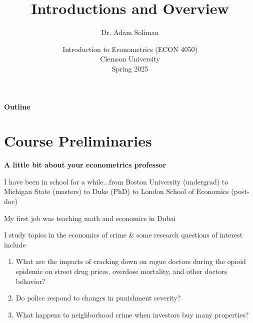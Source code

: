 \documentclass[11pt, aspectratio=169]{beamer}
\newenvironment{wideitemize}{\itemize\addtolength{\itemsep}{5pt}}{\enditemize}
\begin{document}
	 

\title{Introductions and Overview}
\author{Dr. Adam Soliman}
\date{Introduction to Econometrics (ECON 4050) \\ Clemson University\\Spring 2025} 

\begin{frame}
	\maketitle
\end{frame}	
 
\begin{frame}{\bf \large Outline}
	\tableofcontents
\end{frame} 

\section{Course Preliminaries}

\begin{frame}{\bf \large A little bit about your econometrics professor}
	
	\begin{wideitemize}
		\item I have been in school for a while...from Boston University (undergrad) to Michigan State (masters) to Duke (PhD) to London School of Economics (post-doc)
		
		\item My first job was teaching math and economics in Dubai

		\item I study topics in the economics of crime \& some research questions of interest include
		\begin{enumerate}
			\item What are the impacts of cracking down on rogue doctors during the opioid epidemic on street drug prices, overdose mortality, and other doctors behavior?
			\item Do police respond to changes in punishment severity?
			\item What happens to neighborhood crime when investors buy many properties?
		\end{enumerate}
	\end{wideitemize}
\end{frame}
\end{document}
